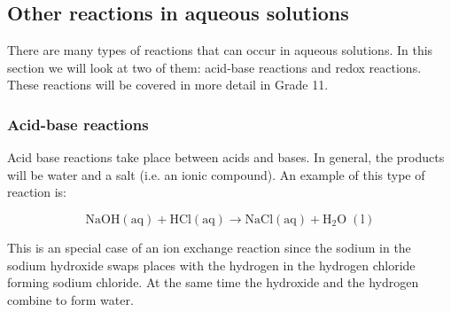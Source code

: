             \subsection{Other reactions in aqueous solutions}
            \nopagebreak
\label{m38719*id08212}
There are many types of reactions that can occur in aqueous solutions. In this section we will look at two of them: acid-base reactions and redox reactions. These reactions will be covered in more detail in Grade 11. 
\par 
\label{m38719*eip-329}
            \subsubsection{Acid-base reactions}
            \nopagebreak
\label{m38719*id0821354}Acid base reactions take place between acids and bases. In general, the products will be water and a salt (i.e. an ionic compound). An example of this type of reaction is: \label{m38719*eid1534}\nopagebreak\noindent{}
	    
    \begin{equation}
    \mathrm{NaOH\left(aq\right)}+\mathrm{HCl\left(aq\right)}\to \mathrm{NaCl\left(aq\right)}+{\mathrm{H}}_{2}\mathrm{O\; \left(l\right)}\tag{17.26}
      \end{equation}
\par \label{m38719*eip-588}This is an special case of an ion exchange reaction since the sodium in the sodium hydroxide swaps places with the hydrogen in the hydrogen chloride forming sodium chloride. At the same time the hydroxide and the hydrogen combine to form water. \par 
\label{m38719*eip-454}
